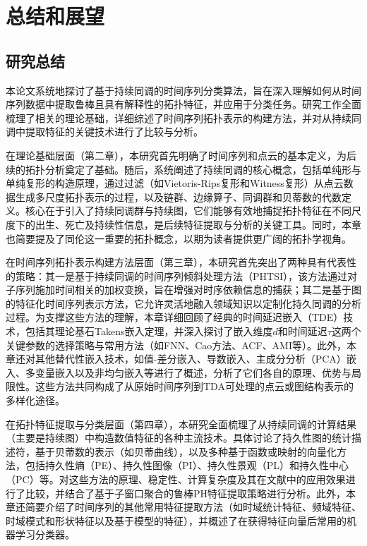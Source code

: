 \section{总结和展望}

\subsection{研究总结}
本论文系统地探讨了基于持续同调的时间序列分类算法，旨在深入理解如何从时间序列数据中提取鲁棒且具有解释性的拓扑特征，并应用于分类任务。研究工作全面梳理了相关的理论基础，详细综述了时间序列拓扑表示的构建方法，并对从持续同调中提取特征的关键技术进行了比较与分析。

在理论基础层面（第二章），本研究首先明确了时间序列和点云的基本定义，为后续的拓扑分析奠定了基础。随后，系统阐述了持续同调的核心概念，包括单纯形与单纯复形的构造原理，通过过滤（如Vietoris-Rips复形和Witness复形）从点云数据生成多尺度拓扑表示的过程，以及链群、边缘算子、同调群和贝蒂数的代数定义。核心在于引入了持续同调群与持续图，它们能够有效地捕捉拓扑特征在不同尺度下的出生、死亡及持续性信息，是后续特征提取与分析的关键工具。同时，本章也简要提及了同伦这一重要的拓扑概念，以期为读者提供更广阔的拓扑学视角。

在时间序列拓扑表示构建方法层面（第三章），本研究首先突出了两种具有代表性的策略：其一是基于持续同调的时间序列倾斜处理方法（PHTSI）\cite{JSJC202406009}，该方法通过对子序列施加时间相关的加权变换，旨在增强对时序依赖信息的捕获；其二是基于图的特征化时间序列表示方法\cite{2}，它允许灵活地融入领域知识以定制化持久同调的分析过程。为支撑这些方法的理解，本章详细回顾了经典的时间延迟嵌入（TDE）技术，包括其理论基石Takens嵌入定理\cite{takens2006detecting}，并深入探讨了嵌入维度$d$和时间延迟$\tau$这两个关键参数的选择策略与常用方法（如FNN\cite{rhodes1997false}、Cao方法\cite{cao1997practical}、ACF\cite{kantz2003nonlinear}、AMI\cite{wallot2018calculation}等）。此外，本章还对其他替代性嵌入技术，如值-差分嵌入、导数嵌入\cite{lekscha2018phase, lainscsek2015delay}、主成分分析（PCA）嵌入\cite{broomhead1986extracting, gibson1992analytic}、多变量嵌入\cite{barnard2001embedding}以及非均匀嵌入\cite{jia2019detecting, jia2020refined}等进行了概述，分析了它们各自的原理、优势与局限性。这些方法共同构成了从原始时间序列到TDA可处理的点云或图结构表示的多样化途径。

在拓扑特征提取与分类层面（第四章），本研究全面梳理了从持续同调的计算结果（主要是持续图）中构造数值特征的各种主流技术。具体讨论了持久性图的统计描述符\cite{mittal2017topological}，基于贝蒂数的表示（如贝蒂曲线），以及多种基于函数或映射的向量化方法，包括持久性熵（PE）\cite{atienza2020stability, atienza2018stability}、持久性图像（PI）\cite{adams2017persistence}、持久性景观（PL）\cite{1}和持久性中心（PC）\cite{JSJC202406009}等。对这些方法的原理、稳定性、计算复杂度及其在文献中的应用效果进行了比较，并结合了基于子窗口聚合的鲁棒PH特征提取策略\cite{3}进行分析。此外，本章还简要介绍了时间序列的其他常用特征提取方法（如时域统计特征、频域特征、时域模式和形状特征以及基于模型的特征），并概述了在获得特征向量后常用的机器学习分类器。


